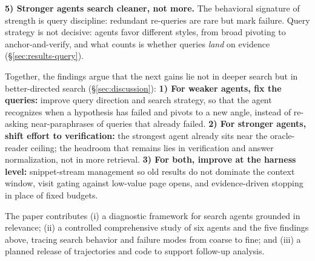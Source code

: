\textbf{5) Stronger agents search cleaner, not more.} The behavioral signature of strength is query discipline: redundant re-queries are rare but mark failure. Query strategy is not decisive: agents favor different styles, from broad pivoting to anchor-and-verify, and what counts is whether queries \emph{land} on evidence (§\ref{sec:results-query}).

Together, the findings argue that the next gains lie not in deeper search but in better-directed search (§\ref{sec:discussion}):
\textbf{1) For weaker agents, fix the queries:} improve query direction and search strategy, so that the agent recognizes when a hypothesis has failed and pivots to a new angle, instead of re-asking near-paraphrases of queries that already failed.
\textbf{2) For stronger agents, shift effort to verification:} the strongest agent already sits near the oracle-reader ceiling; the headroom that remains lies in verification and answer normalization, not in more retrieval.
\textbf{3) For both, improve at the harness level:} snippet-stream management so old results do not dominate the context window, visit gating against low-value page opens, and evidence-driven stopping in place of fixed budgets.

The paper contributes (i) a diagnostic framework for search agents grounded in relevance; (ii) a controlled comprehensive study of six agents and the five findings above, tracing search behavior and failure modes from coarse to fine; and (iii) a planned release of trajectories and code to support follow-up analysis.
